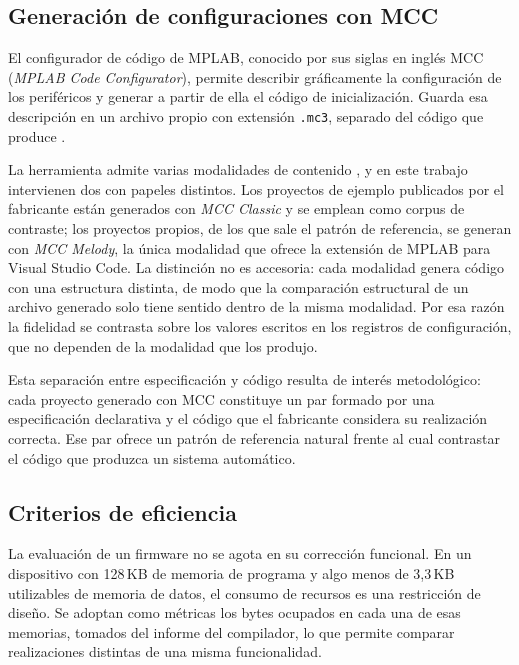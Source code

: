 \subsection{Generación de configuraciones con MCC}

El configurador de código de MPLAB, conocido por sus siglas en inglés MCC
(\emph{MPLAB Code Configurator}), permite describir gráficamente la
configuración de los periféricos y generar a partir de ella el código de
inicialización. Guarda esa descripción en un archivo propio con extensión
\texttt{.mc3}, separado del código que produce
\cite{microchip2022mcc}.

La herramienta admite varias modalidades de contenido \cite{microchip2022mcc},
y en este trabajo intervienen dos con papeles distintos. Los proyectos de ejemplo
publicados por el fabricante están generados con \emph{MCC Classic} y se emplean
como corpus de contraste; los proyectos propios, de los que sale el patrón de
referencia, se generan con \emph{MCC Melody}, la única modalidad que ofrece la
extensión de MPLAB para Visual Studio Code. La distinción no es accesoria: cada
modalidad genera código con una estructura distinta, de modo que la comparación
estructural de un archivo generado solo tiene sentido dentro de la misma
modalidad. Por esa razón la fidelidad se contrasta sobre los valores escritos en
los registros de configuración, que no dependen de la modalidad que los produjo.

Esta separación entre especificación y código resulta de interés metodológico:
cada proyecto generado con MCC constituye un par formado por una especificación
declarativa y el código que el fabricante considera su realización correcta. Ese
par ofrece un patrón de referencia natural frente al cual contrastar el código
que produzca un sistema automático.

\subsection{Criterios de eficiencia}

La evaluación de un firmware no se agota en su corrección funcional. En un
dispositivo con 128\,KB de memoria de programa y algo menos de 3,3\,KB
utilizables de memoria de datos, el consumo de recursos es una restricción de
diseño. Se adoptan como métricas los bytes ocupados en cada una de esas
memorias, tomados del informe del compilador, lo que permite comparar
realizaciones distintas de una misma funcionalidad.


